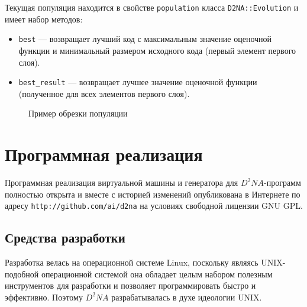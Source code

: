 \documentclass[utf8,a5paper,portrait,12pt]{eskdtext}
\begin{document}
Текущая популяция находится в свойстве \texttt{population} класса
\texttt{D2NA::Evolution} и имеет набор методов:
\begin{itemize}
  \item \texttt{best} — возвращает лучший код с максимальным значение оценочной
        функции и минимальный размером исходного кода (первый элемент первого
        слоя).
  \item \texttt{best\_result} — возвращает лучшее значение оценочной функции
        (полученное для всех элементов первого слоя).
\end{itemize}

\begin{figure}
  \centering
  
  \caption{Пример обрезки популяции}
\end{figure}

\newpage
\section{Программная реализация}

Программная реализация виртуальной машины и генератора для $D^2NA$-программ
полностью открыта и  вместе с историей изменений опубликована в Интернете по
адресу \texttt{http://github.com/ai/d2na} на условиях свободной лицензии
GNU GPL.

\subsection{Средства разработки}

Разработка велась на операционной системе Linux, поскольку являясь UNIX-подобной
операционной системой она обладает целым набором полезным инструментов для
разработки и позволяет программировать быстро и эффективно. Поэтому $D^2NA$
разрабатывалась в духе идеологии UNIX.
\end{document}
